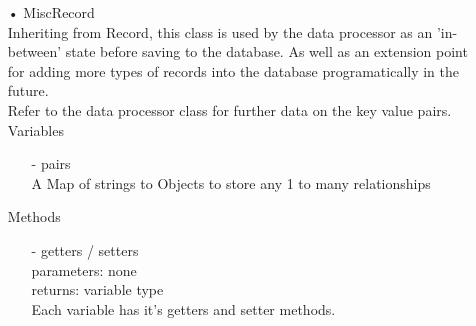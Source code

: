 \documentclass[oneside, english, final]{design}
\begin{document}
\begin{itemize}
	\item[•]MiscRecord 
	\\Inheriting from Record, this class is used by the data processor as an 'in-between' state before saving to the database. As well as an extension point for adding more types of records into the database programatically in the future.
	\\Refer to the data processor class for further data on the key value pairs.
	      \\Variables
	      \begin{itemize}
		      \item[-] pairs
		            \\ A Map of strings to Objects to store any 1 to many relationships
	      \end{itemize}
	      Methods
	      \begin{itemize}
		      \item[-]getters / setters
		            \\parameters: none
		            \\returns: variable type
		            \\Each variable has it's getters and setter methods.
	      \end{itemize}


\end{itemize}
\end{document}
